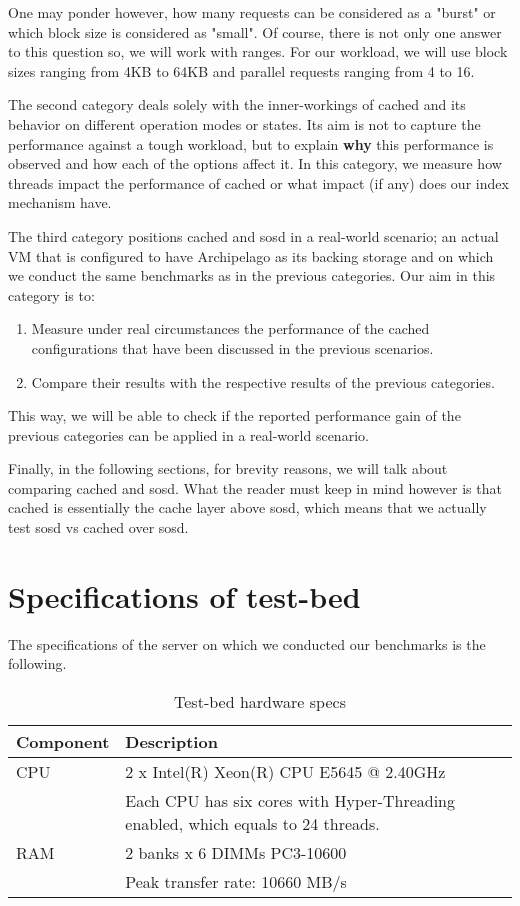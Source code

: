 One may ponder however, how many requests can be considered as a "burst" or 
which block size is considered as "small". Of course, there is not only one 
answer to this question so, we will work with ranges. For our workload, we will 
use block sizes ranging from 4KB to 64KB and parallel requests ranging from 4 
to 16.

The second category deals solely with the inner-workings of cached and its 
behavior on different operation modes or states. Its aim is not to capture the 
performance against a tough workload, but to explain \textbf{why} this 
performance is observed and how each of the options affect it. In this 
category, we measure how threads impact the performance of cached or what 
impact (if any) does our index mechanism have.

The third category positions cached and sosd in a real-world scenario; an 
actual VM that is configured to have Archipelago as its backing storage and on 
which we conduct the same benchmarks as in the previous categories. Our aim in 
this category is to:

\begin{enumerate}
	\item Measure under real circumstances the performance of the cached 
		configurations that have been discussed in the previous 
		scenarios.
	\item Compare their results with the respective results of the previous 
		categories.
\end{enumerate}

This way, we will be able to check if the reported performance gain of the 
previous categories can be applied in a real-world scenario.

Finally, in the following sections, for brevity reasons, we will talk about 
comparing cached and sosd. What the reader must keep in mind however is that 
cached is essentially the cache layer above sosd, which means that we actually 
test sosd vs cached over sosd.

\section{Specifications of test-bed}\label{sec:test-bed}

The specifications of the server on which we conducted our benchmarks is the 
following.

\begin{table}[H]
	\centering
	\begin{tabular}{ | l | l | }
		\hline
		Component & Description \\ \hline \hline
		CPU &  2 x Intel(R) Xeon(R) CPU E5645 @ 2.40GHz \cite{e5645} \\
		 & Each CPU has six cores with Hyper-Threading enabled, which equals to 
		 24 threads. \\ \hline
		RAΜ & 2 banks x 6 DIMMs PC3-10600 \\
		& Peak transfer rate: 10660 MB/s \\ \hline
	\end{tabular}
	\caption{Test-bed hardware specs}
	\label{tab:hardware-specs}
\end{table}

